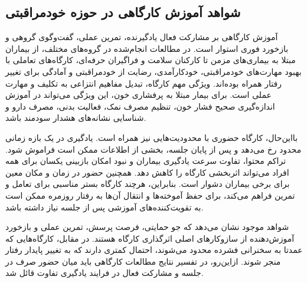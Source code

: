 \subsection{شواهد آموزش کارگاهی در حوزه خودمراقبتی}
آموزش کارگاهی بر مشارکت فعال یادگیرنده، تمرین عملی، گفت‌وگوی گروهی و بازخورد فوری استوار است. در مطالعات انجام‌شده در گروه‌های مختلف، از بیماران مبتلا به بیماری‌های مزمن تا کارکنان سلامت و فراگیران حرفه‌ای، کارگاه‌های تعاملی با بهبود مهارت‌های خودمراقبتی، خودکارآمدی، رضایت از خودمراقبتی و آمادگی برای تغییر رفتار همراه بوده‌اند. ویژگی مهم کارگاه، تبدیل مفاهیم انتزاعی به تکلیف و مهارت عملی است. برای بیمار مبتلا به پرفشاری خون، این ویژگی می‌تواند در آموزش اندازه‌گیری صحیح فشار خون، تنظیم مصرف نمک، فعالیت بدنی، مصرف دارو و شناسایی نشانه‌های هشدار سودمند باشد.
\par
بااین‌حال، کارگاه حضوری با محدودیت‌هایی نیز همراه است. یادگیری در یک بازه زمانی محدود رخ می‌دهد و پس از پایان جلسه، بخشی از اطلاعات ممکن است فراموش شود. تراکم محتوا، تفاوت سرعت یادگیری بیماران و نبود امکان بازبینی یکسان برای همه افراد می‌تواند اثربخشی کارگاه را کاهش دهد. همچنین حضور در زمان و مکان معین برای برخی بیماران دشوار است. بنابراین، هرچند کارگاه بستر مناسبی برای تعامل و تمرین فراهم می‌کند، برای حفظ آموخته‌ها و انتقال آن‌ها به رفتار روزمره ممکن است به تقویت‌کننده‌های آموزشی پس از جلسه نیاز داشته باشد.
\par
شواهد موجود نشان می‌دهد که جو حمایتی، فرصت پرسش، تمرین عملی و بازخورد آموزش‌دهنده از سازوکارهای اصلی اثرگذاری کارگاه هستند. در مقابل، کارگاه‌هایی که عمدتا به سخنرانی فشرده محدود می‌شوند، احتمال کمتری دارند که به تغییر پایدار رفتار منجر شوند. ازاین‌رو، در تفسیر نتایج مطالعات کارگاهی باید میان حضور صرف در جلسه و مشارکت فعال در فرایند یادگیری تفاوت قائل شد.

